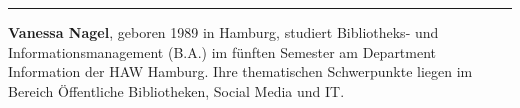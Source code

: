 \begin{center}\rule{0.5\linewidth}{\linethickness}\end{center}

\textbf{Vanessa Nagel}, geboren 1989 in Hamburg, studiert Bibliotheks-
und Informationsmanagement (B.A.) im fünften Semester am Department
Information der HAW Hamburg. Ihre thematischen Schwerpunkte liegen im
Bereich Öffentliche Bibliotheken, Social Media und IT.

